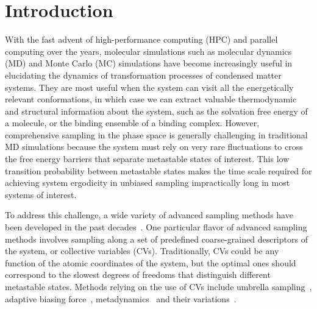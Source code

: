 \documentclass[journal=jacsat,manuscript=article]{achemso}
\begin{document}
\section{Introduction}
With the fast advent of high-performance computing (HPC) and parallel computing over the years, molecular simulations such as molecular dynamics (MD) and Monte Carlo (MC) simulations have become increasingly useful in elucidating the dynamics of transformation processes of condensed matter systems. They are most useful when the system can visit all the energetically relevant conformations, in which case we can extract valuable thermodynamic and structural information about the system, such as the solvation free energy of a molecule, or the binding ensemble of a binding complex. However, comprehensive sampling in the phase space is generally challenging in traditional MD simulations because the system must rely on very rare fluctuations to cross the free energy barriers that separate metastable states of interest. This low transition probability between metastable states makes the time scale required for achieving system ergodicity in unbiased sampling impractically long in most systems of interest. 

To address this challenge, a wide variety of advanced sampling methods have been developed in the past decades~\cite{henin2022enhanced}. One particular flavor of advanced sampling methods involves sampling along a set of predefined coarse-grained descriptors of the system, or collective variables (CVs). Traditionally, CVs could be any function of the atomic coordinates of the system, but the optimal ones should correspond to the slowest degrees of freedoms that distinguish different metastable states. Methods relying on the use of CVs include umbrella sampling~\cite{umbrella}, adaptive biasing force~\cite{ABF}, metadynamics~\cite{metad} and their variations~\cite{bussi2006free, bonomi2010enhanced, var2}. 
\end{document}

